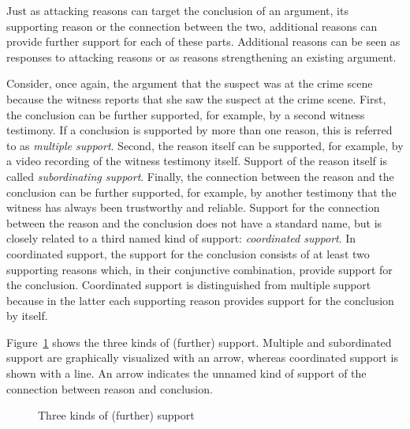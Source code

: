 \documentclass[10pt]{article}
\begin{document}
Just as attacking reasons can target the conclusion of an argument, its supporting
reason or the connection between the two, additional reasons 
can provide further support for each of these parts. %
Additional reasons can be seen as responses to attacking reasons or as reasons strengthening an existing argument. 

Consider, once again, the argument that the suspect was at the crime scene because the witness reports that she saw the suspect at the crime scene. 
First, the conclusion can be further supported, for example, by a second witness testimony. 
If a conclusion is supported by more than one reason, this is referred 
to as \textit{multiple support}. 
%
Second, the reason itself can be supported, for example, 
by a video recording of the witness testimony itself. 
Support of the reason itself is called \textit{subordinating support}. 
%
Finally, the connection between the reason and the conclusion can be further supported, for example, 
by another testimony that the witness has always been trustworthy and reliable. 
Support for the connection between the reason and the conclusion does not have a standard name, but is closely related 
to a third named kind of support: \textit{coordinated support}. In coordinated support, the support for the conclusion consists of at least 
two supporting reasons which, in their conjunctive combination, provide support for the conclusion. Coordinated support is distinguished from multiple support because in the latter each supporting reason 
provides support for the conclusion by itself. 
%

Figure~\ref{fig:support} shows the three kinds of (further) support. Multiple and subordinated support are graphically visualized with an arrow, whereas coordinated support is shown with a line. An arrow indicates the unnamed kind of support of the connection between reason and conclusion.

\begin{figure}[bt]
\centering

\caption{Three kinds of (further) support\label{fig:support}}
\end{figure}


\end{document}
